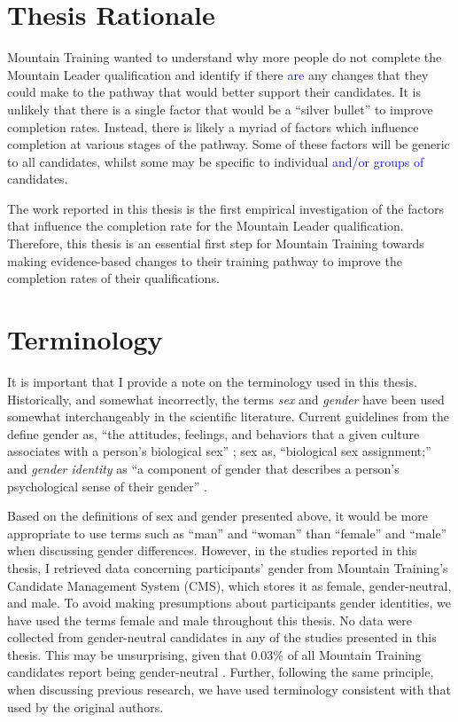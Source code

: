 \documentclass[
  12pt,
  a4paper,
]{book}
\begin{document}
\hypertarget{thesis-rationale}{%
\section{Thesis Rationale}\label{thesis-rationale}}

Mountain Training wanted to understand why more people do not complete the Mountain Leader qualification and identify if there \textcolor{blue}{are} any changes that they could make to the pathway that would better support their candidates. It is unlikely that there is a single factor that would be a ``silver bullet'' to improve completion rates. Instead, there is likely a myriad of factors which influence completion at various stages of the pathway. Some of these factors will be generic to all candidates, whilst some may be specific to individual \textcolor{blue}{and/or groups of} candidates.

The work reported in this thesis is the first empirical investigation of the factors that influence the completion rate for the Mountain Leader qualification. Therefore, this thesis is an essential first step for Mountain Training towards making evidence-based changes to their training pathway to improve the completion rates of their qualifications.

\hypertarget{terminology}{%
\section{Terminology}\label{terminology}}

It is important that I provide a note on the terminology used in this thesis. Historically, and somewhat incorrectly, the terms \emph{sex} and \emph{gender} have been used somewhat interchangeably in the scientific literature. Current guidelines from the \citet{APA2020} define gender as, ``the attitudes, feelings, and behaviors that a given culture associates with a person's biological sex'' \citep[p 12]{APA2012}; sex as, ``biological sex assignment;'' and \textit{gender identity} as ``a component of gender that describes a person's psychological sense of their gender'' \citep[Section 5.5]{APA2020}.

Based on the definitions of sex and gender presented above, it would be more appropriate to use terms such as ``man'' and ``woman'' than ``female'' and ``male'' when discussing gender differences. However, in the studies reported in this thesis, I retrieved data concerning participants' gender from Mountain Training's Candidate Management System (CMS), which stores it as female, gender-neutral, and male. To avoid making presumptions about participants gender identities, we have used the terms female and male throughout this thesis. No data were collected from gender-neutral candidates in any of the studies presented in this thesis. This may be unsurprising, given that 0.03\% of all Mountain Training candidates report being gender-neutral \citep{MountainTrainingUK2019a}. Further, following the same principle, when discussing previous research, we have used terminology consistent with that used by the original authors.
\end{document}

